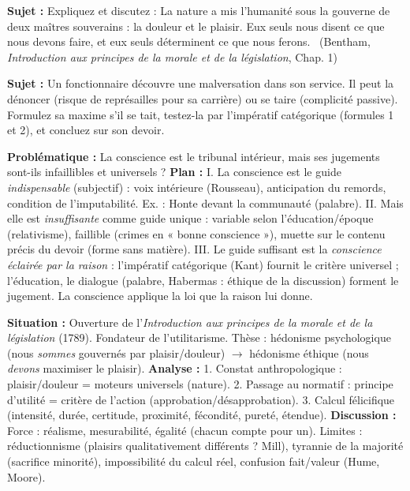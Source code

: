 \documentclass[11pt]{article}
\begin{document}
\begin{exercice}
\textbf{Sujet :} Expliquez et discutez : \guillemotleft La nature a mis l'humanité sous la gouverne de deux maîtres souverains : la douleur et le plaisir. Eux seuls nous disent ce que nous devons faire, et eux seuls déterminent ce que nous ferons. \guillemotright\ (Bentham, \emph{Introduction aux principes de la morale et de la législation}, Chap. 1)
\end{exercice}

\begin{exercice}
\textbf{Sujet :} Un fonctionnaire découvre une malversation dans son service. Il peut la dénoncer (risque de représailles pour sa carrière) ou se taire (complicité passive). Formulez sa maxime s'il se tait, testez-la par l'impératif catégorique (formules 1 et 2), et concluez sur son devoir.
\end{exercice}

\begin{corrige}
\textbf{Problématique :} La conscience est le tribunal intérieur, mais ses jugements sont-ils infaillibles et universels ?
\textbf{Plan :}
I. La conscience est le guide \emph{indispensable} (subjectif) : voix intérieure (Rousseau), anticipation du remords, condition de l'imputabilité. Ex. : Honte devant la communauté (palabre).
II. Mais elle est \emph{insuffisante} comme guide unique : variable selon l'éducation/époque (relativisme), faillible (crimes en « bonne conscience »), muette sur le contenu précis du devoir (forme sans matière).
III. Le guide suffisant est la \emph{conscience éclairée par la raison} : l'impératif catégorique (Kant) fournit le critère universel ; l'éducation, le dialogue (palabre, Habermas : éthique de la discussion) forment le jugement. La conscience applique la loi que la raison lui donne.
\end{corrige}

\begin{corrige}
\textbf{Situation :} Ouverture de l'\emph{Introduction aux principes de la morale et de la législation} (1789). Fondateur de l'utilitarisme. Thèse : hédonisme psychologique (nous \emph{sommes} gouvernés par plaisir/douleur) $\rightarrow$ hédonisme éthique (nous \emph{devons} maximiser le plaisir).
\textbf{Analyse :} 1. Constat anthropologique : plaisir/douleur = moteurs universels (nature). 2. Passage au normatif : principe d'utilité = critère de l'action (approbation/désapprobation). 3. Calcul félicifique (intensité, durée, certitude, proximité, fécondité, pureté, étendue).
\textbf{Discussion :} Force : réalisme, mesurabilité, égalité (chacun compte pour un). Limites : réductionnisme (plaisirs qualitativement différents ? Mill), tyrannie de la majorité (sacrifice minorité), impossibilité du calcul réel, confusion fait/valeur (Hume, Moore).
\end{corrige}
\end{document}
